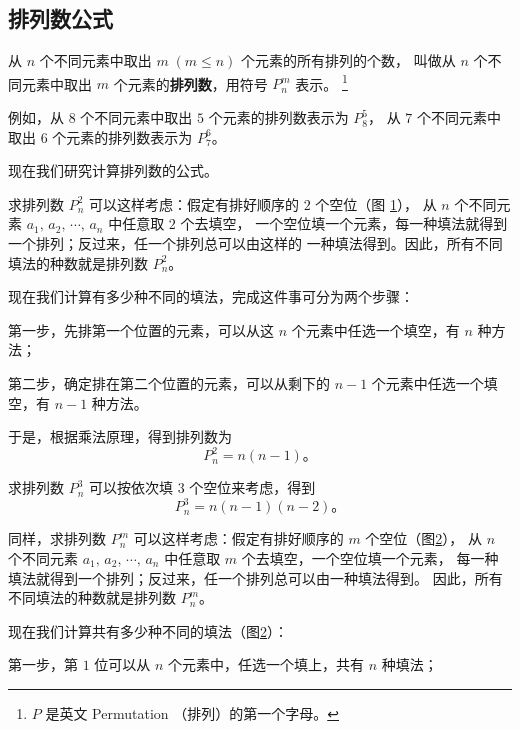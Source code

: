 \subsection{排列数公式}\label{subsec:2-3}

从 $n$ 个不同元素中取出 $m \; (m \leqslant n)$ 个元素的所有排列的个数，
叫做从 $n$ 个不同元素中取出 $m$ 个元素的\textbf{排列数}，用符号 $P_n^m$ 表示。
\footnote{$P$ 是英文 Permutation （排列）的第一个字母。}

例如，从 $8$ 个不同元素中取出 $5$ 个元素的排列数表示为 $P_8^5$，
从 $7$ 个不同元素中取出 $6$ 个元素的排列数表示为 $P_7^6$。

现在我们研究计算排列数的公式。

求排列数 $P_n^2$ 可以这样考虑：假定有排好顺序的 $2$ 个空位（图 \ref{fig:2-3}），
从 $n$ 个不同元素 $a_1,\, a_2,\, \cdots,\, a_n$ 中任意取 $2$ 个去填空，
一个空位填一个元素，每一种填法就得到一个排列；反过来，任一个排列总可以由这样的
一种填法得到。因此，所有不同填法的种数就是排列数 $P_n^2$。

\begin{figure}[htbp]
    \centering
    
    \caption{}\label{fig:2-3}
\end{figure}

现在我们计算有多少种不同的填法，完成这件事可分为两个步骤：

第一步，先排第一个位置的元素，可以从这 $n$ 个元素中任选一个填空，有 $n$ 种方法；

第二步，确定排在第二个位置的元素，可以从剩下的 $n - 1$ 个元素中任选一个填空，有 $n - 1$ 种方法。

于是，根据乘法原理，得到排列数为
$$ P_n^2 = n (n - 1) \text{。} $$

求排列数 $P_n^3$ 可以按依次填 $3$ 个空位来考虑，得到
$$ P_n^3 = n (n - 1) (n - 2) \text{。} $$

同样，求排列数 $P_n^m$ 可以这样考虑：假定有排好顺序的 $m$ 个空位（图\ref{fig:2-4}），
从 $n$ 个不同元素 $a_1,\, a_2,\, \cdots,\, a_n$ 中任意取 $m$ 个去填空，一个空位填一个元素，
每一种填法就得到一个排列；反过来，任一个排列总可以由一种填法得到。
因此，所有不同填法的种数就是排列数 $P_n^m$。

现在我们计算共有多少种不同的填法（图\ref{fig:2-4}）：

\begin{figure}[htbp]
    \centering
    
    \caption{}\label{fig:2-4}
\end{figure}

第一步，第 $1$ 位可以从 $n$ 个元素中，任选一个填上，共有 $n$ 种填法；

